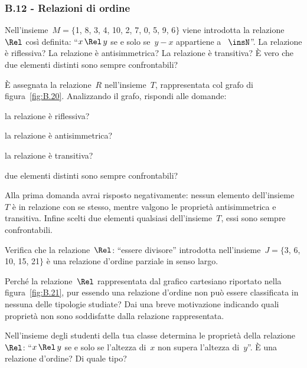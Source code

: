 \begin{multicols}{2}
\subsubsection*{B.12 - Relazioni di ordine}
\begin{esercizio}
\label{ese:B.44}
Nell'insieme~$M =\{$1, 8, 3, 4, 10, 2, 7, 0, 5, 9, 6$\}$ viene introdotta la relazione~$\Rel$ così definita: ``$x \,\Rel\, y$ se e solo se~$y-x$ appartiene a ~$\insN$''.
La relazione è riflessiva? La relazione è antisimmetrica? La relazione è transitiva? \`E vero che due elementi
distinti sono sempre confrontabili?
\end{esercizio}

\begin{esercizio}
\label{ese:B.45}
\`E assegnata la relazione~$R$ nell'insieme~$T$, rappresentata col grafo di figura~\ref{fig:B.20}.
Analizzando il grafo, rispondi alle domande:
\begin{itemize*}
\item la relazione è riflessiva?
\item la relazione è antisimmetrica?
\item la relazione è transitiva?
\item due elementi distinti sono sempre confrontabili?
\end{itemize*}
Alla prima domanda avrai risposto negativamente: nessun elemento dell'insieme~$T$ è in relazione con se stesso, mentre valgono le proprietà antisimmetrica e transitiva.
Infine scelti due elementi qualsiasi dell'insieme~$T$, essi sono sempre confrontabili.
\end{esercizio}

\begin{esercizio}
\label{ese:B.46}
Verifica che la relazione~$\Rel$: ``essere divisore'' introdotta nell'insieme~$J =\{$3, 6, 10, 15, 21$\}$ è una relazione d'ordine parziale in senso largo.
\end{esercizio}

\begin{esercizio}
\label{ese:B.47}
Perché la relazione~$\Rel$ rappresentata dal grafico cartesiano riportato nella figura~\ref{fig:B.21}, pur essendo una relazione d'ordine non può essere
classificata in nessuna delle tipologie studiate? Dai una breve motivazione indicando quali proprietà non sono soddisfatte dalla relazione rappresentata.
\end{esercizio}

\begin{esercizio}
\label{ese:B.48}
Nell'insieme degli studenti della tua classe determina le proprietà della relazione~$\Rel$: ``$x \,\Rel\, y$ se e solo se l'altezza di~$x$ non supera l'altezza di~$y$''. \`E una relazione d'ordine? Di quale tipo?
\end{esercizio}


\end{multicols}
